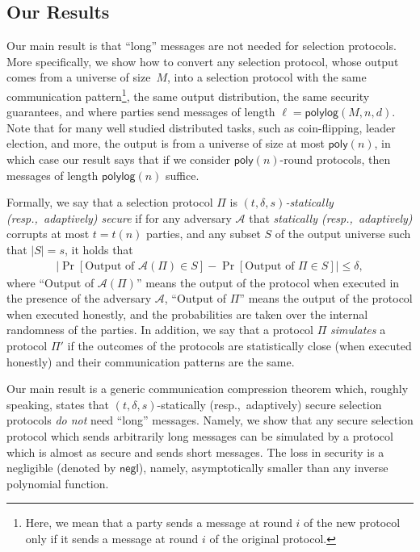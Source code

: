 \documentclass[11pt]{article}
\theoremstyle{plain}
\theoremstyle{definition}
\numberwithin{equation}{section}
\newcommand{\MyParagraph}[1]{\medskip \noindent {\bf #1}}
\renewcommand{\paragraph}{\MyParagraph}
\numberwithin{equation}{section} \newcommand{\aka} {also known as\ }
\newcommand{\resp}{resp.,\ }
\newcommand{\abs}[1]{\left|#1\right|}
\newcommand{\1}{\mathbf{1}}
\newcommand{\Adv}{\mathcal A}
\newcommand{\negl}{{\mathsf{negl}}}
\newcommand{\poly}{{\mathsf{poly}}}
\newcommand{\polylog}{{\mathsf{polylog}}}
\theoremstyle{remark}
\begin{document}
\subsection{Our Results}
Our main result is that ``long'' messages are not needed for selection
protocols.  More specifically, we show how to convert any selection protocol,
whose output comes from a universe of size~$M$, into a selection protocol
with the same communication pattern\footnote{Here, we mean that a party sends a
  message at round $i$ of the new protocol only if it sends a message at round $i$ of
  the original protocol.}, the same output distribution, the same
security guarantees, and where parties send messages of length $\ell =
\polylog(M,n,d)$.  Note that for many well studied distributed tasks, such as
coin-flipping, leader election, and more, the output is from a universe of size
at most $\poly(n)$, in which case our result says that if we consider
$\poly(n)$-round protocols, then messages of length $\polylog(n)$ suffice.

\paragraph{Our results in more detail.}
Formally, we say that a selection protocol $\Pi$ is
\emph{$(t,\delta,s)$-statically (\resp adaptively) secure} if for any adversary
$\Adv$ that \emph{statically (\resp adaptively)} corrupts at most $t=t(n)$
parties, and any subset $S$ of the output universe such that $\abs{S}= s$, it
holds that
\begin{align*}
  \left|\Pr_{}\left[ \text{Output of $\Adv(\Pi)$} \in S \right] - \Pr_{}\left[
      \text{Output of $\Pi$} \in S \right]\right| \leq \delta,
\end{align*}
where ``Output of $\Adv(\Pi)$'' means the output of the protocol when executed
in the presence of the adversary $\Adv$, ``Output of $\Pi$'' means the output of
the protocol when executed honestly, and the probabilities are taken over the
internal randomness of the parties. In addition, we say that a protocol $\Pi$
\emph{simulates} a protocol $\Pi'$ if the outcomes of the protocols are
statistically close (when executed honestly) and their communication patterns
are the same.

Our main result is a generic communication compression theorem which, roughly
speaking, states that $(t,\delta,s)$-statically (\resp adaptively) secure
selection protocols \emph{do not} need ``long'' messages. Namely, we show that
any secure selection protocol which sends arbitrarily long messages can be
simulated by a protocol which is almost as secure and sends short messages. The
loss in security is a negligible (denoted by $\negl$), namely, asymptotically
smaller than any inverse polynomial function.
\end{document}
